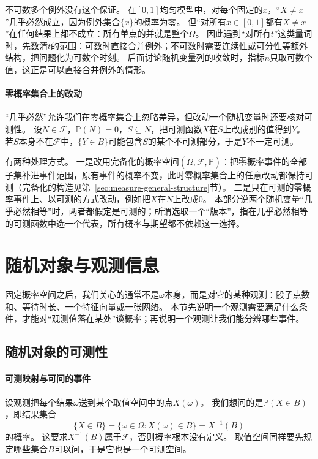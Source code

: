 不可数多个例外没有这个保证。
在$[0,1]$均匀模型中，对每个固定的$x$，“$X\ne x$”几乎必然成立，因为例外集合$\{x\}$的概率为零。
但“对所有$x\in[0,1]$都有$X\ne x$”在任何结果上都不成立：所有单点的并就是整个$\Omega$。
因此遇到“对所有$t$”这类量词时，先数清$t$的范围：可数时直接合并例外；不可数时需要连续性或可分性等额外结构，把问题化为可数个时刻。
后面讨论随机变量列的收敛时，指标$n$只取可数个值，这正是可以直接合并例外的情形。

\paragraph{零概率集合上的改动}
“几乎必然”允许我们在零概率集合上忽略差异，但改动一个随机变量时还要核对可测性。
设$N\in\mathcal F$，$\mathbb P(N)=0$，$S\subseteq N$，把可测函数$X$在$S$上改成别的值得到$Y$。
若$S$本身不在$\mathcal F$中，$\{Y\in B\}$可能包含$S$的某个不可测部分，于是$Y$不一定可测。

有两种处理方式。
一是改用完备化的概率空间$(\Omega,\overline{\mathcal F},\overline{\mathbb P})$：把零概率事件的全部子集补进事件范围，原有事件的概率不变，此时零概率集合上的任意改动都保持可测（完备化的构造见第~\ref{sec:measure-general-structure}节）。
二是只在可测的零概率事件上、以可测的方式改动，例如把$X$在$N$上改成$0$。
本部分说两个随机变量“几乎必然相等”时，两者都假定是可测的；所谓选取一个“版本”，指在几乎必然相等的可测函数中选一个代表，所有概率与期望都不依赖这一选择。

\section{随机对象与观测信息}
\label{sec:pmod-random-objects}

固定概率空间之后，我们关心的通常不是$\omega$本身，而是对它的某种观测：骰子点数和、等待时长、一个特征向量或一张网络。
本节先说明一个观测需要满足什么条件，才能对“观测值落在某处”谈概率；再说明一个观测让我们能分辨哪些事件。

\subsection{随机对象的可测性}

\paragraph{可测映射与可问的事件}
设观测把每个结果$\omega$送到某个取值空间中的点$X(\omega)$。
我们想问的是$\mathbb P(X\in B)$，即结果集合
\[
  \{X\in B\}=\{\omega\in\Omega:X(\omega)\in B\}=X^{-1}(B)
\]
的概率。
这要求$X^{-1}(B)$属于$\mathcal F$，否则概率根本没有定义。
取值空间同样要先规定哪些集合$B$可以问，于是它也是一个可测空间。


